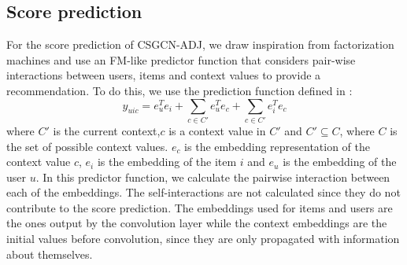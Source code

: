 \subsection{Score prediction}\label{subsec:csgcn_adj_score_pred}
For the score prediction of CSGCN-ADJ, we draw inspiration from factorization machines and use an FM-like predictor function that considers pair-wise interactions between users, items and context values to provide a recommendation.
To do this, we use the prediction function defined in :
\begin{equation}\label{eq:csgcn_adj_scorepred}
    \hat{y}_{uic} = e_u^Te_i + \sum_{c \in C'}e_u^Te_{c} + \sum_{c \in C'}e_i^Te_{c}
\end{equation}
where $C'$ is the current context,$c$ is a context value in $C'$ and $C' \subseteq C$, where $C$ is the set of possible context values.
$e_{c}$ is the embedding representation of the context value $c$, $e_i$ is the embedding of the item $i$ and $e_u$ is the embedding of the user $u$.
In this predictor function, we calculate the pairwise interaction between each of the embeddings.
The self-interactions are not calculated since they do not contribute to the score prediction.
The embeddings used for items and users are the ones output by the convolution layer while the context embeddings are the initial values before convolution, since they are only propagated with information about themselves.

